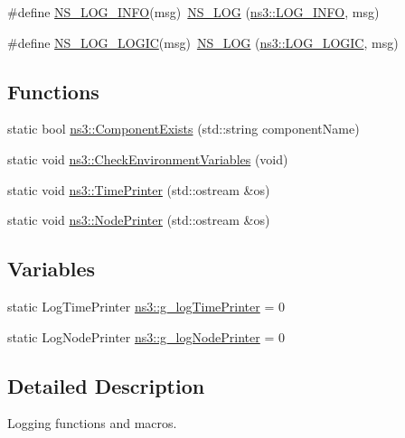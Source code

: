 \begin{DoxyCompactItemize}
\item 
\#define \hyperlink{group__logging_gafbd73ee2cf9f26b319f49086d8e860fb}{N\+S\+\_\+\+L\+O\+G\+\_\+\+I\+N\+FO}(msg)~\hyperlink{log-macros-disabled_8h_ab01b4392d98b06fb128e77c85129a477}{N\+S\+\_\+\+L\+OG} (\hyperlink{namespacens3_aa6464a4d69551a9cc968e17a65f39bdba4aac1013d5e6ce265900e02c1100605f}{ns3\+::\+L\+O\+G\+\_\+\+I\+N\+FO}, msg)
\item 
\#define \hyperlink{group__logging_ga88acd260151caf2db9c0fc84997f45ce}{N\+S\+\_\+\+L\+O\+G\+\_\+\+L\+O\+G\+IC}(msg)~\hyperlink{log-macros-disabled_8h_ab01b4392d98b06fb128e77c85129a477}{N\+S\+\_\+\+L\+OG} (\hyperlink{namespacens3_aa6464a4d69551a9cc968e17a65f39bdbad960c03edfbfa929248b88c0f974a555}{ns3\+::\+L\+O\+G\+\_\+\+L\+O\+G\+IC}, msg)
\end{DoxyCompactItemize}
\subsection*{Functions}
\begin{DoxyCompactItemize}
\item 
static bool \hyperlink{group__logging_gaadcc698770aae684c54dbd1ef4e4b37a}{ns3\+::\+Component\+Exists} (std\+::string component\+Name)
\item 
static void \hyperlink{group__logging_gacdc0bdeb2d8a90089d4fb09c4b8569ff}{ns3\+::\+Check\+Environment\+Variables} (void)
\item 
static void \hyperlink{group__logging_gaaad3642e8247a056cd83001d805b0812}{ns3\+::\+Time\+Printer} (std\+::ostream \&os)
\item 
static void \hyperlink{group__logging_gaaffbf70ff3766cd62b8bbd9b140d2a1b}{ns3\+::\+Node\+Printer} (std\+::ostream \&os)
\end{DoxyCompactItemize}
\subsection*{Variables}
\begin{DoxyCompactItemize}
\item 
static Log\+Time\+Printer \hyperlink{group__logging_ga6bc890b9ae1db6402550a830c0ced500}{ns3\+::g\+\_\+log\+Time\+Printer} = 0
\item 
static Log\+Node\+Printer \hyperlink{group__logging_ga7fb552b12a9e9494bc92193053396bb8}{ns3\+::g\+\_\+log\+Node\+Printer} = 0
\end{DoxyCompactItemize}


\subsection{Detailed Description}
Logging functions and macros. 


